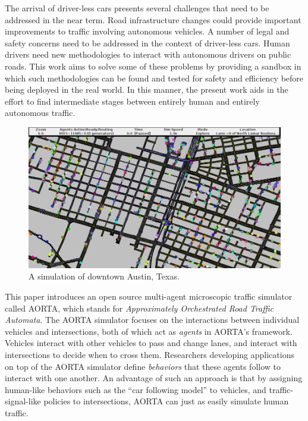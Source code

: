 \documentclass[letterpaper, 10 pt, conference]{ieeeconf}  %
\begin{document}
The arrival of driver-less cars presents several challenges that need to be
addressed in the near term. Road infrastructure changes could provide important
improvements to traffic involving autonomous vehicles. A number of legal and
safety concerns need to be addressed in the context of driver-less cars. Human
drivers need new methodologies to interact with autonomous drivers on public roads.
This work aims to solve some of these problems by providing a sandbox in which such
methodologies can be found and tested for safety and efficiency before being
deployed in the real world.  In this manner, the present work aids in the effort to find
intermediate stages between entirely human and entirely autonomous traffic.

\begin{figure}[h]
  \centering \includegraphics[width=\linewidth]{downtown_atx.png}
  \caption{A simulation of downtown Austin, Texas.}
  \label{fig:ui_screenshot}
  \vspace{-10pt}
\end{figure}


This paper introduces an open source multi-agent microscopic traffic
simulator called AORTA, which stands for \textit{Approximately
Orchestrated Road Traffic Automata}. The AORTA simulator focuses on
the interactions between individual vehicles and intersections, both
of which act as \textit{agents} in AORTA's framework. Vehicles
interact with other vehicles to pass and change lanes, and interact
with intersections to decide when to cross them. Researchers
developing applications on top of the AORTA simulator define
\textit{behaviors} that these agents follow to interact with one
another. An advantage of such an approach is that by assigning
human-like behaviors such as the ``car following model''
\cite{brackstone1999car} to vehicles, and traffic-signal-like
policies to intersections, AORTA can just as easily simulate human
traffic.
\end{document}
